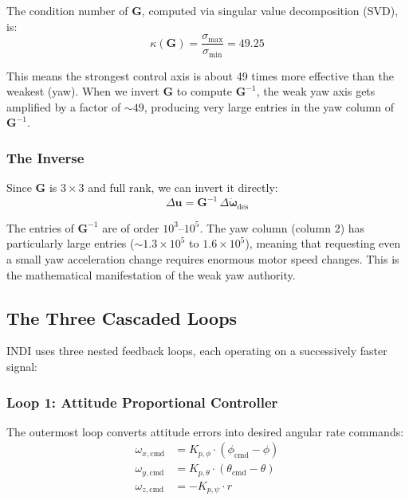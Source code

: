 \documentclass[12pt, a4paper]{article}
\newcommand{\bu}{\bm{u}}
\newcommand{\bomega}{\bm{\omega}}
\begin{document}
The condition number of $\bm{G}$, computed via singular value decomposition (SVD), is:
\begin{equation}
    \kappa(\bm{G}) = \frac{\sigma_{\max}}{\sigma_{\min}} = 49.25
\end{equation}

This means the strongest control axis is about 49 times more effective than the weakest (yaw).  When we invert $\bm{G}$ to compute $\bm{G}^{-1}$, the weak yaw axis gets amplified by a factor of $\sim 49$, producing very large entries in the yaw column of $\bm{G}^{-1}$.

\subsubsection{The Inverse}

Since $\bm{G}$ is $3 \times 3$ and full rank, we can invert it directly:
\begin{equation}
    \Delta\bu = \bm{G}^{-1} \, \Delta\dot{\bomega}_{\text{des}}
\end{equation}

The entries of $\bm{G}^{-1}$ are of order $10^3$--$10^5$.  The yaw column (column 2) has particularly large entries ($\sim 1.3 \times 10^5$ to $1.6 \times 10^5$), meaning that requesting even a small yaw acceleration change requires enormous motor speed changes.  This is the mathematical manifestation of the weak yaw authority.

\subsection{The Three Cascaded Loops}

INDI uses three nested feedback loops, each operating on a successively faster signal:

\subsubsection{Loop 1: Attitude Proportional Controller}

The outermost loop converts attitude errors into desired angular rate commands:
\begin{align}
    \omega_{x,\text{cmd}} &= K_{p,\phi} \cdot (\phi_{\text{cmd}} - \phi) \\
    \omega_{y,\text{cmd}} &= K_{p,\theta} \cdot (\theta_{\text{cmd}} - \theta) \\
    \omega_{z,\text{cmd}} &= -K_{p,\psi} \cdot r
\end{align}
\end{document}
